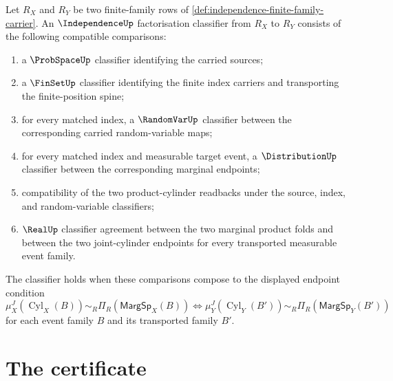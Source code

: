 \begin{definition}
\label{def:independence-factorisation-classifier}
Let $R_X$ and $R_Y$ be two finite-family rows of \autoref{def:independence-finite-family-carrier}. An $\IndependenceUp$ factorisation classifier from $R_X$ to $R_Y$ consists of the following compatible comparisons:
\begin{enumerate}
\item a $\ProbSpaceUp$ classifier identifying the carried sources;
\item a $\FinSetUp$ classifier identifying the finite index carriers and transporting the finite-position spine;
\item for every matched index, a $\RandomVarUp$ classifier between the corresponding carried random-variable maps;
\item for every matched index and measurable target event, a $\DistributionUp$ classifier between the corresponding marginal endpoints;
\item compatibility of the two product-cylinder readbacks under the source, index, and random-variable classifiers;
\item $\RealUp$ classifier agreement between the two marginal product folds and between the two joint-cylinder endpoints for every transported measurable event family.
\end{enumerate}
The classifier holds when these comparisons compose to the displayed endpoint condition
$$
\mu_X^J(\operatorname{Cyl}_X(B))\sim_R\Pi_R(\mathsf{MargSp}_X(B))
\Longleftrightarrow
\mu_Y^J(\operatorname{Cyl}_Y(B'))\sim_R\Pi_R(\mathsf{MargSp}_Y(B'))
$$
for each event family $B$ and its transported family $B'$.
\end{definition}

\section{The certificate}
\label{sec:independence-certificate}


